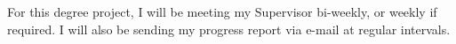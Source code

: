 For this degree project, I will be meeting my Supervisor bi-weekly, or weekly if required. I will also be sending my progress report via e-mail at regular intervals.